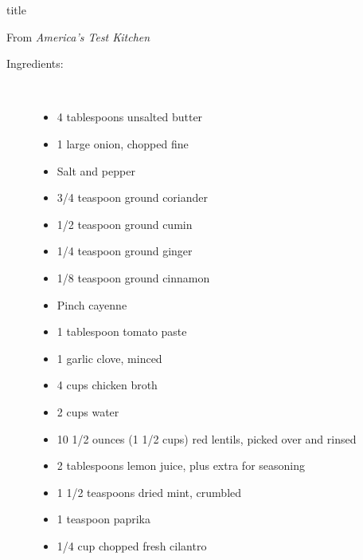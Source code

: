 \documentclass [11pt, letterpaper] {article}
\begin{document}
 {title}

\begin{flushright}
From {\it America's Test Kitchen}
\end{flushright}

\begin{description}

\item[Ingredients:]\ \\
	\begin{itemize}
	\item 4	tablespoons unsalted butter
	\item 1	large onion, chopped fine
	\item Salt and pepper
	\item	3/4 teaspoon ground coriander
	\item 1/2 teaspoon ground cumin
	\item 1/4 teaspoon ground ginger
	\item 1/8 teaspoon ground cinnamon
	\item Pinch cayenne
	\item 1 tablespoon tomato paste
	\item 1 garlic clove, minced
	\item 4 cups chicken broth
	\item 2 cups water
	\item 10 1/2 ounces (1 1/2 cups) red lentils, picked over and rinsed
	\item 2 tablespoons lemon juice, plus extra for seasoning
	\item 1 1/2 teaspoons dried mint, crumbled
	\item 1 teaspoon paprika
	\item 1/4 cup chopped fresh cilantro
	\end{itemize}


\end{description}
\end{document}
